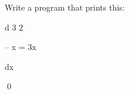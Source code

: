 Write a program that prints this:

\begin{console}

 d  3     2

-- x  = 3x

dx

\end{console}

\qed

